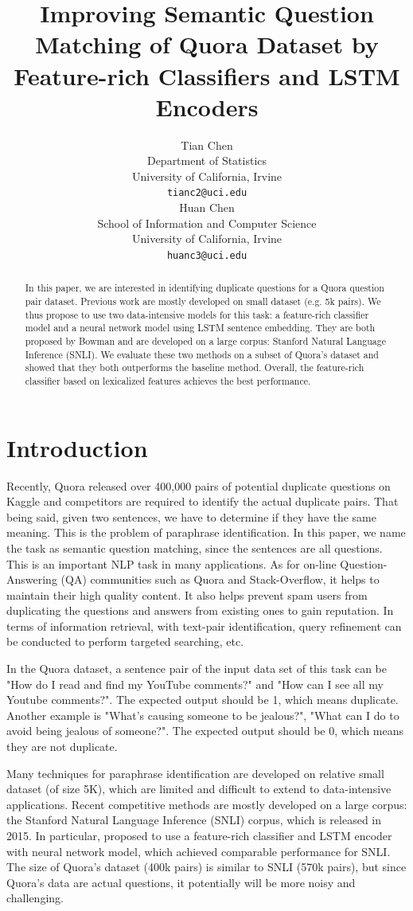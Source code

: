 \documentclass[11pt,a4paper]{article}
\title{Improving Semantic Question Matching of Quora Dataset by Feature-rich Classifiers and LSTM Encoders}
\author{Tian Chen \\
	Department of Statistics \\
	University of California, Irvine \\
	{\tt tianc2@uci.edu} 
	 \\\And
	Huan Chen \\
	School of Information and Computer Science \\
	University of California, Irvine \\
	{\tt huanc3@uci.edu} \\
  }
\date{}
\begin{document}
\maketitle
\begin{abstract}
In this paper, we are interested in identifying duplicate questions for a Quora question pair dataset. Previous work are mostly developed on small dataset (e.g. 5k pairs). We thus propose to use two data-intensive models for this task: a feature-rich classifier model and a neural network model using LSTM sentence embedding. They are both proposed by Bowman  \cite{bowman2015large} and are developed on a large corpus: Stanford Natural Language Inference (SNLI). We evaluate these two methods on a subset of Quora's dataset and showed that they both outperforms the baseline method. Overall, the feature-rich classifier based on lexicalized features achieves the best performance.
\end{abstract}

\section{Introduction}
Recently, Quora released over 400,000 pairs of potential duplicate questions on Kaggle and competitors are required to identify the actual duplicate pairs. That being said, given two sentences, we have to determine if they have the same meaning. This is the problem of paraphrase identification. In this paper, we name the task as semantic question matching, since the sentences are all questions. This is an important NLP task in many applications. As for on-line Question-Answering (QA) communities such as Quora and Stack-Overflow, it helps to maintain their high quality content. It also helps prevent spam users from duplicating the questions and answers from existing ones to gain reputation. In terms of information retrieval, with text-pair identification, query refinement can be conducted to perform targeted searching, etc. 

In the Quora dataset, a sentence pair of the input data set of this task can be "How do I read and find my YouTube comments?" and "How can I see all my Youtube comments?". The expected output should be 1, which means duplicate. Another example is "What's causing someone to be jealous?", "What can I do to avoid being jealous of someone?". The expected output should be 0, which means they are not duplicate. 

Many techniques \cite{fernando2008semantic, ji2013discriminative, cheng2015syntax} for paraphrase identification are developed on relative small dataset (of size 5K), which are limited and difficult to extend to data-intensive applications. Recent competitive methods are mostly developed on a large corpus: the Stanford Natural Language Inference (SNLI) corpus, which is released in 2015. In particular, \cite{bowman2015large} proposed to use a feature-rich classifier and LSTM encoder with neural network model, which achieved comparable performance for SNLI. The size of Quora's dataset (400k pairs) is similar to SNLI (570k pairs), but since Quora's data are actual questions, it potentially will be more noisy and challenging.
\end{document}
